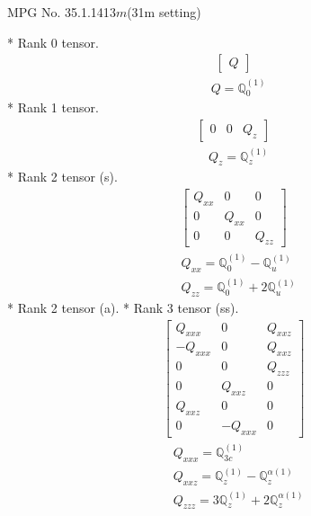 \documentclass[fleqn,8pt,landscape]{jsarticle}
\begin{document}
\setcounter{MaxMatrixCols}{32}

\renewcommand{\tablename}{Table~}
\renewcommand{\figurename}{Figure~}
\begin{center}
\LARGE
MPG No. 35.1.141\quad$3m$\quad(31m setting)
\end{center}
* Rank 0 tensor.
\begin{align*}
\begin{bmatrix} Q \end{bmatrix}
\end{align*}
\begin{align*}
& Q = \mathbb{Q}_{0}^{(1)}
\end{align*}
* Rank 1 tensor.
\begin{align*}
\begin{bmatrix} 0 & 0 & Q_{z} \end{bmatrix}
\end{align*}
\begin{align*}
& Q_{z} = \mathbb{Q}_{z}^{(1)}
\end{align*}
* Rank 2 tensor (s).
\begin{align*}
\begin{bmatrix} Q_{xx} & 0 & 0 \\ 0 & Q_{xx} & 0 \\ 0 & 0 & Q_{zz} \end{bmatrix}
\end{align*}
\begin{align*}
& Q_{xx} = \mathbb{Q}_{0}^{(1)} - \mathbb{Q}_{u}^{(1)} \\
& Q_{zz} = \mathbb{Q}_{0}^{(1)} + 2 \mathbb{Q}_{u}^{(1)}
\end{align*}
* Rank 2 tensor (a).
* Rank 3 tensor (ss).
\begin{align*}
\begin{bmatrix} Q_{xxx} & 0 & Q_{xxz} \\ - Q_{xxx} & 0 & Q_{xxz} \\ 0 & 0 & Q_{zzz} \\ 0 & Q_{xxz} & 0 \\ Q_{xxz} & 0 & 0 \\ 0 & - Q_{xxx} & 0 \end{bmatrix}
\end{align*}
\begin{align*}
& Q_{xxx} = \mathbb{Q}_{3c}^{(1)} \\
& Q_{xxz} = \mathbb{Q}_{z}^{(1)} - \mathbb{Q}_{z}^{\alpha(1)} \\
& Q_{zzz} = 3 \mathbb{Q}_{z}^{(1)} + 2 \mathbb{Q}_{z}^{\alpha(1)}
\end{align*}
\end{document}
